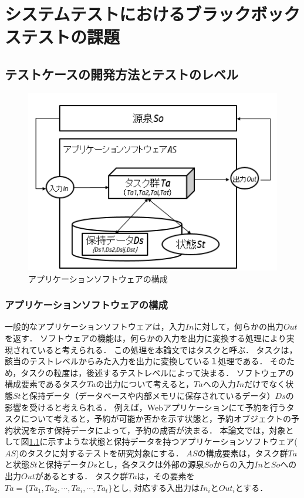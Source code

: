 \chapter{システムテストにおけるブラックボックステストの課題}
\section{テストケースの開発方法とテストのレベル}
\begin{figure}[htbp]
  \begin{center}
  \includegraphics[width=12cm]{./image/fig-1.png}
  \caption{アプリケーションソフトウェアの構成}
  \label{fig:fig-1}
  \end{center}
\end{figure}

\subsection{アプリケーションソフトウェアの構成}
一般的なアプリケーションソフトウェアは，入力$In$に対して，何らかの出力$Out$を返す．
ソフトウェアの機能は，何らかの入力を出力に変換する処理により実現されていると考えられる．
この処理を本論文ではタスクと呼ぶ．
タスクは，該当のテストレベルからみた入力を出力に変換している１処理である．
そのため，タスクの粒度は，後述するテストレベルによって決まる．
ソフトウェアの構成要素であるタスク$Ta$の出力について考えると，$Ta$への入力$In$だけでなく状態$St$と保持データ（データベースや内部メモリに保存されているデータ）$Ds$の影響を受けると考えられる．
例えば，Webアプリケーションにて予約を行うタスクについて考えると，予約が可能か否かを示す状態と，予約オブジェクトの予約状況を示す保持データによって，予約の成否が決まる．
本論文では，対象として図\ref{fig:fig-1}に示すような状態と保持データを持つアプリケーションソフトウェア($AS$)のタスクに対するテストを研究対象にする．
$AS$の構成要素は，タスク群$Ta$と状態$St$と保持データ$Ds$とし，各タスクは外部の源泉$So$からの入力$In$と$So$への出力$Out$があるとする．
タスク群$Ta$は，その要素を$Ta=\{Ta_1,Ta_2,\cdots,Ta_i,\cdots,Ta_t \}$とし, 対応する入出力は$In_i$と$Out_i$とする．

